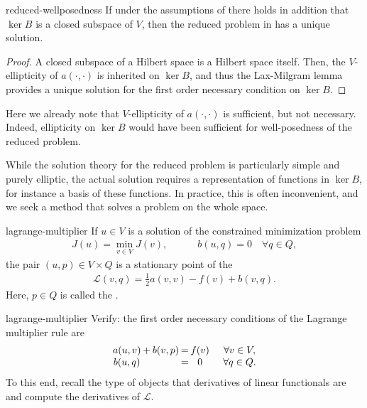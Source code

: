 \begin{Lemma}{reduced-wellposedness}
  If under the assumptions of  there
  holds in addition that $\ker B$ is a closed subspace of $V$, then
  the reduced problem in  has a
  unique solution.
\end{Lemma}

\begin{proof}
  A closed subspace of a Hilbert space is a Hilbert space
  itself. Then, the $V$-ellipticity of $a(\cdot,\cdot)$ is inherited on
  $\ker B$, and thus the Lax-Milgram lemma provides a unique solution
  for the first order necessary condition on $\ker B$.
\end{proof}

\begin{remark}
  Here we already note that $V$-ellipticity of $a(\cdot,\cdot)$ is sufficient,
  but not necessary. Indeed, ellipticity on $\ker B$ would have been
  sufficient for well-posedness of the reduced problem.
\end{remark}

\begin{intro}
  While the solution theory for the reduced problem is particularly
  simple and purely elliptic, the actual solution requires a
  representation of functions in $\ker B$, for instance a basis of
  these functions. In practice, this is often inconvenient, and we
  seek a method that solves a problem on the whole space.
\end{intro}

\begin{Theorem}{lagrange-multiplier}
  If $u\in V$ is a solution of the constrained minimization problem
  \begin{gather*}
    J(u) = \min_{v\in V} J(v), \quad\qquad
    b(u,q) = 0 \quad\forall q\in Q,
  \end{gather*}
  the pair $(u,p)\in V\times Q$ is a stationary point of
  the 
  \begin{gather}
    \mathscr L(v,q) = \tfrac12 a(v,v) - f(v) + b(v,q).
  \end{gather}
  Here, $p\in Q$ is called the .
\end{Theorem}

\begin{Problem}{lagrange-multiplier}
  Verify: the first order necessary conditions of the Lagrange
  multiplier rule are
  \begin{gather*}
    \arraycolsep.1em
    \begin{matrix}
      a(u,v) &+& b(v,p) &=& f(v) &\quad&\forall v\in V, \\
      b(u,q) && &=& 0 &&\forall q\in Q.
    \end{matrix}
  \end{gather*}
  To this end, recall the type of objects that derivatives of linear
  functionals are and compute the derivatives of $\mathscr L$.
\end{Problem}

